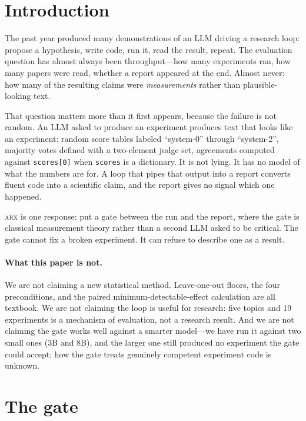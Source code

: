 \documentclass[11pt]{article}
\newcommand{\toolname}{\textsc{arx}}
\newcommand{\code}[1]{{\small\texttt{#1}}}
\begin{document}
\section{Introduction}

The past year produced many demonstrations of an LLM driving a research loop:
propose a hypothesis, write code, run it, read the result, repeat. The
evaluation question has almost always been throughput---how many experiments
ran, how many papers were read, whether a report appeared at the end. Almost
never: how many of the resulting claims were \emph{measurements} rather than
plausible-looking text.

That question matters more than it first appears, because the failure is not
random. An LLM asked to produce an experiment produces text that looks like an
experiment: random score tables labeled ``system-0'' through ``system-2'',
majority votes defined with a two-element judge set, agreements computed
against \code{scores[0]} when \code{scores} is a dictionary. It is not lying.
It has no model of what the numbers are for. A loop that pipes that output
into a report converts fluent code into a scientific claim, and the report
gives no signal which one happened.

\toolname{} is one response: put a gate between the run and the report, where
the gate is classical measurement theory rather than a second LLM asked to be
critical. The gate cannot fix a broken experiment. It can refuse to describe
one as a result.

\paragraph{What this paper is not.} We are not claiming a new statistical
method. Leave-one-out floors, the four preconditions, and the paired
minimum-detectable-effect calculation are all textbook. We are not claiming
the loop is useful for research: five topics and 19 experiments is a
mechanism of evaluation, not a research result. And we are not claiming the
gate works well against a smarter model---we have run it against two small
ones (3B and 8B), and the larger one still produced no experiment the gate
could accept; how the gate treats genuinely competent experiment code is
unknown.

\section{The gate}
\end{document}
